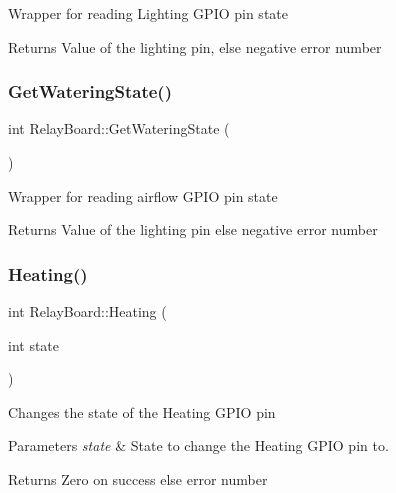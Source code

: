 Wrapper for reading Lighting G\+P\+IO pin state

\begin{DoxyReturn}{Returns}
Value of the lighting pin, else negative error number 
\end{DoxyReturn}
\mbox{\label{classRelayBoard_a2f9f8154a49a9d8ed3b7c54c39a5ed65}} 
\subsubsection{\texorpdfstring{Get\+Watering\+State()}{GetWateringState()}}
{\footnotesize\ttfamily int Relay\+Board\+::\+Get\+Watering\+State (\begin{DoxyParamCaption}{ }\end{DoxyParamCaption})}

Wrapper for reading airflow G\+P\+IO pin state

\begin{DoxyReturn}{Returns}
Value of the lighting pin else negative error number 
\end{DoxyReturn}
\mbox{\label{classRelayBoard_abdfd142dd723bda5fb961f2b83e04d98}} 
\subsubsection{\texorpdfstring{Heating()}{Heating()}}
{\footnotesize\ttfamily int Relay\+Board\+::\+Heating (\begin{DoxyParamCaption}\item[{int}]{state }\end{DoxyParamCaption})}

Changes the state of the Heating G\+P\+IO pin


\begin{DoxyParams}{Parameters}
{\em state} & State to change the Heating G\+P\+IO pin to.\\
\hline
\end{DoxyParams}
\begin{DoxyReturn}{Returns}
Zero on success else error number 
\end{DoxyReturn}
\mbox{\label{classRelayBoard_aee18a60a8063ebc87331cbb8fbb1a42f}} 
